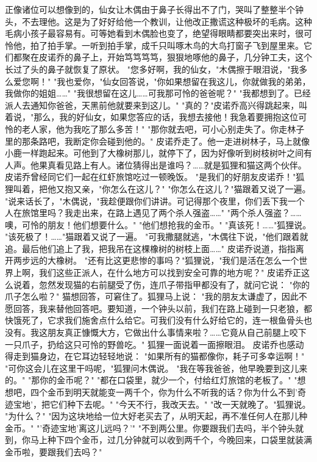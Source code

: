 \documentclass[12pt,UTF8]{ctexbook}
\begin{document}
正像诸位可以想像到的，仙女让木偶由于鼻子长得出不了门，哭叫了整整半个钟头，不去理他。这是为了好好给他一个教训，让他改正撒谎这种极坏的毛病。这种毛病小孩子最容易有。可等她看到木偶脸也变了，绝望得眼睛都要突出来时，很可怜他，拍了拍手掌。一听到拍手掌，成千只叫啄木鸟的大鸟打窗子飞到屋里来。它们都聚在皮诺乔的鼻子上，开始笃笃笃笃，狠狠地啄他的鼻子，几分钟工夫，这个长过了头的鼻子就恢复了原状。
"您多好啊，我的仙女，"木偶擦于眼泪说，"我多么爱您啊！"
"我也爱你，"仙女回答说，"你如果想留在我这儿，你就做我的弟弟，我做你的姐姐……"
"我很想留在这儿……可我那可怜的爸爸呢？"
"我都想到了。已经派人去通知你爸爸，天黑前他就要来到这儿。"
"真的？"皮诺乔高兴得跳起来，叫着说，"那么，我的好仙女，如果您答应的话，我想去接他！我急着要拥抱这位可怜的老人家，他为我吃了那么多苦！"
"那你就去吧，可小心别走失了。你走林子里的那条路吧，我断定你会碰到他的。"
皮诺乔走了。他一走进树林子，马上就像小鹿一样跑起来。可他到了大橡树那儿，就停下了，因为好像听到树枝树叶之间有人声。他果真看见路上有人。诸位猜得出是谁吗？……就是狐狸和猫这两个伙伴。皮诺乔曾经同它们一起在红虾旅馆吃过一顿晚饭。
"是我们的好朋友皮诺乔！"狐狸叫着，把他又抱又亲，"你怎么在这儿？"
"你怎么在这儿？"猫跟着又说了一遍。
"说来话长了，"木偶说，"我趁便跟你们讲讲。可记得那个夜里，你们丢下我一个人在旅馆里吗？我走出来，在路上遇见了两个杀人强盗……"
"两个杀人强盗？……噢，可怜的朋友！他们想要什么。"
"他们想抢我的金币。"
"真该死！……"狐狸说。
"该死极了！……"猫跟着又说了一遍。
"可我撒腿就逃，"木偶往下说，"他们跟着就追。最后他们追上了我，把我吊在这棵橡树的树枝上面……"
皮诺乔说道，指指离开两步远的大橡树。
"还有比这更悲惨的事吗？"狐狸说，"我们是活在怎么一个世界上啊，我们这些正派人，在什么地方可以找到安全可靠的地方呢？"
皮诺乔正这么说着，忽然发现猫的右前腿受了伤，连爪子带指甲都没有了，就问它说：
"你的爪子怎么啦？"
猫想回答，可窘住了。狐狸马上说：
"我的朋友太谦虚了，因此不愿回答，我来替他回答吧。要知道，一个钟头以前，我们在路上碰到一只老狼，都快饿死了，它求我们施舍点什么给它。可我们没有什么好给它的，连一根鱼骨头也没有。我这朋友真正慷慨大方，它做出什么事情来啦？……它竟从自己前腿上咬下一只爪子，扔给这只可怜的野兽吃。"
狐狸一面说着一面擦眼泪。
皮诺乔也感动得走到猫身边，在它耳边轻轻地说：
"如果所有的猫都像你，耗子可多幸运啊！"
"可你这会儿在这里干吗呢，"狐狸问木偶说。
"我在等我爸爸，他早晚要到这儿来的。"
"那你的金币呢？"
"都在口袋里，就少一个，付给红灯旅馆的老板了。"
"想想吧，四个金币到明天就能变一两千个，你为什么不听我的话？你为什么不到'奇迹宝地'，把它们种下去呢。"
"今天不行，我改天去。"
"改一天就晚了。"狐狸说。
"为什么？"
"因为这块地给一位大好老买去了，从明天起，再不准任何人在那儿种金币。"
"'奇迹宝地'离这儿远吗？'"
"不到两公里。你要跟我们去吗，半个钟头就到，你马上种下四个金币，过几分钟就可以收到两千个，今晚回来，口袋里就装满金币啦，要跟我们去吗？"
\end{document}
